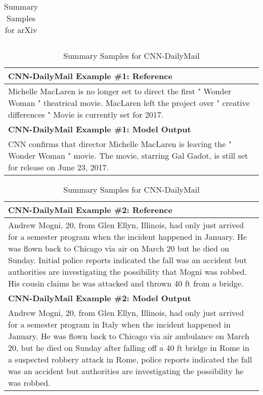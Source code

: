 \begin{table}[!htbp]
\begin{tabular}{p{\linewidth}}
\\
    \bottomrule
    \end{tabular}
    \caption{
    Summary Samples for arXiv
    }
\end{table}

\begin{table}[!htbp]
    \centering
    \tiny
    \begin{tabular}{p{\linewidth}} 
    \toprule
    \textbf{CNN-DailyMail Example \#1: Reference} \\
    \midrule
Michelle MacLaren is no longer set to direct the first " Wonder Woman " theatrical movie. MacLaren left the project over " creative differences " Movie is currently set for 2017.
    \\
    \midrule
    \textbf{CNN-DailyMail Example \#1: Model Output} \\
    \midrule
CNN confirms that director Michelle MacLaren is leaving the " Wonder Woman " movie. The movie, starring Gal Gadot, is still set for release on June 23, 2017.
    \\
    \end{tabular}
    \begin{tabular}{p{\linewidth}} 
    \midrule
    \textbf{CNN-DailyMail Example \#2: Reference} \\
    \midrule
Andrew Mogni, 20, from Glen Ellyn, Illinois, had only just arrived for a semester program when the incident happened in January. He was flown back to Chicago via air on March 20 but he died on Sunday. Initial police reports indicated the fall was an accident but authorities are investigating the possibility that Mogni was robbed. His cousin claims he was attacked and thrown 40 ft from a bridge.
    \\
    \midrule
    \textbf{CNN-DailyMail Example \#2: Model Output} \\
    \midrule
Andrew Mogni, 20, from Glen Ellyn, Illinois, had only just arrived for a semester program in Italy when the incident happened in January. He was flown back to Chicago via air ambulance on March 20, but he died on Sunday after falling off a 40 ft bridge in Rome in a suspected robbery attack in Rome, police reports indicated the fall was an accident but authorities are investigating the possibility he was robbed.
    \\
    \bottomrule
    \end{tabular}
    \caption{
    Summary Samples for CNN-DailyMail
    }
\end{table}

